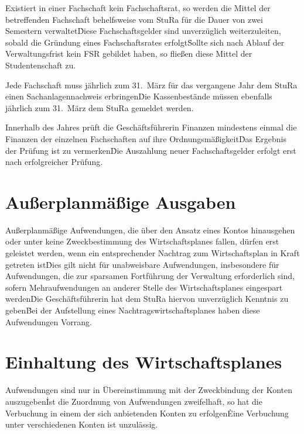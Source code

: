 \Abs \Satz Existiert in einer Fachschaft kein Fachschaftsrat, so werden die Mittel der betreffenden Fachschaft behelfsweise vom StuRa für die Dauer von zwei Semestern verwaltet\. Diese Fachschaftsgelder sind unverzüglich weiterzuleiten, sobald die Gründung eines Fachschaftsrates erfolgt\. Sollte sich nach Ablauf der Verwaltungsfrist kein FSR gebildet haben, so fließen diese Mittel der Studentenschaft zu.

\Abs \Satz Jede Fachschaft muss jährlich zum 31.~März für das vergangene Jahr dem StuRa einen Sachanlagennachweis erbringen\. Die Kassenbestände müssen ebenfalls jährlich zum 31.~März dem StuRa gemeldet werden.

\Abs \Satz Innerhalb des Jahres prüft die Geschäftsführerin Finanzen mindestens einmal die Finanzen der einzelnen Fachschaften auf ihre Ordnungsmäßigkeit\. Das Ergebnis der Prüfung ist zu vermerken\. Die Auszahlung neuer Fachschaftsgelder erfolgt erst nach erfolgreicher Prüfung.



\section{Außerplanmäßige Ausgaben}

\Abs \Satz Außerplanmäßige Aufwendungen, die über den Ansatz eines Kontos hinausgehen oder unter keine Zweckbestimmung des Wirtschaftsplanes fallen, dürfen erst geleistet werden, wenn ein entsprechender Nachtrag zum Wirtschaftsplan in Kraft getreten ist\. Dies gilt nicht für unabweisbare Aufwendungen, insbesondere für Aufwendungen, die zur sparsamen Fortführung der Verwaltung erforderlich sind, sofern Mehraufwendungen an anderer Stelle des Wirtschaftsplanes eingespart werden\. Die Geschäftsführerin hat dem StuRa hiervon unverzüglich Kenntnis zu geben\. Bei der Aufstellung eines Nachtragswirtschaftsplanes haben diese Aufwendungen Vorrang.



\section{Einhaltung des Wirtschaftsplanes}

\Abs \Satz Aufwendungen sind nur in Übereinstimmung mit der Zweckbindung der Konten auszugeben\. Ist die Zuordnung von Aufwendungen zweifelhaft, so hat die Verbuchung in einem der sich anbietenden Konten zu erfolgen\. Eine Verbuchung unter verschiedenen Konten ist unzulässig.



